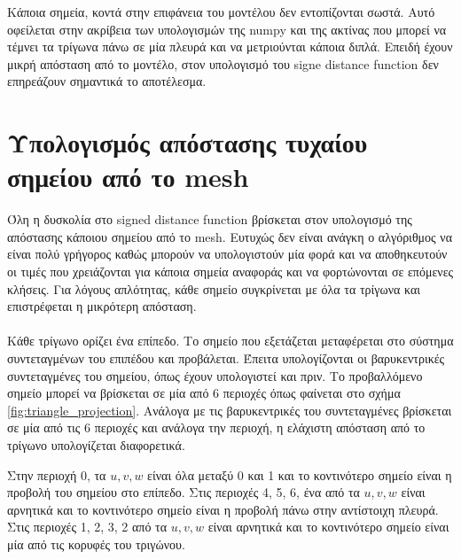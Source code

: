 \documentclass{report}
\begin{document}

Κάποια σημεία, κοντά στην επιφάνεια του μοντέλου δεν εντοπίζονται σωστά. Αυτό οφείλεται στην ακρίβεια των υπολογισμών της numpy
και της ακτίνας που μπορεί να τέμνει τα τρίγωνα πάνω σε μία πλευρά και να μετριούνται κάποια διπλά. Επειδή έχουν μικρή
απόσταση από το μοντέλο, στον υπολογισμό του signe distance function δεν επηρεάζουν σημαντικά το αποτέλεσμα.


\section{Υπολογισμός απόστασης τυχαίου σημείου από το mesh}
Όλη η δυσκολία στο signed distance function βρίσκεται στον υπολογισμό της απόστασης κάποιου σημείου από το mesh.
Ευτυχώς δεν είναι ανάγκη ο αλγόριθμος να είναι πολύ γρήγορος καθώς μπορούν να υπολογιστούν μία φορά και να
αποθηκευτούν οι τιμές που χρειάζονται για κάποια σημεία αναφοράς και να φορτώνονται σε επόμενες κλήσεις.
Για λόγους απλότητας, κάθε σημείο συγκρίνεται με όλα τα τρίγωνα και επιστρέφεται η μικρότερη απόσταση.
\\\\
Κάθε τρίγωνο ορίζει ένα επίπεδο. Το σημείο που εξετάζεται μεταφέρεται στο σύστημα συντεταγμένων του επιπέδου και προβάλεται.
Έπειτα υπολογίζονται οι βαρυκεντρικές συντεταγμένες του σημείου, όπως έχουν υπολογιστεί και πριν.
Το προβαλλόμενο σημείο μπορεί να βρίσκεται σε μία από 6 περιοχές όπως φαίνεται στο σχήμα \ref{fig:triangle_projection}.
Ανάλογα με τις βαρυκεντρικές του συντεταγμένες βρίσκεται σε μία από τις 6 περιοχές και ανάλογα την περιοχή,
η ελάχιστη απόσταση από το τρίγωνο υπολογίζεται διαφορετικά.

 \label{fig:triangle_projection}

Στην περιοχή 0, τα $u, v, w$ είναι όλα μεταξύ 0 και 1 και το κοντινότερο σημείο είναι η προβολή του σημείου στο επίπεδο.
Στις περιοχές 4, 5, 6, ένα από τα $u, v, w$ είναι αρνητικά και το κοντινότερο σημείο είναι η προβολή πάνω στην
αντίστοιχη πλευρά. Στις περιοχές 1, 2, 3, 2 από τα $u, v, w$ είναι αρνητικά και το κοντινότερο σημείο 
είναι μία από τις κορυφές του τριγώνου.

\end{document}
